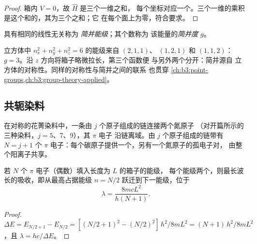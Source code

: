 \begin{proof}
箱内 $V = 0$，故 $\hat H$ 是三个一维之和，
每个坐标对应一个。三个一维的乘积
是这个和的，其为三个之和；它
在每个面上为零，符合要求。
\end{proof}

\begin{definition}[简并能级]\label{def:b3:quantum-model-systems:degenerate}
具有相同的线性无关称为
\emph{简并能级}；其个数称为
该能量的\emph{简并度} $g$。
\end{definition}

\begin{example}[简并与对称性]\label{ex:b3:quantum-model-systems:cube}
立方体中 $n_x^2 + n_y^2 + n_z^2 = 6$ 的能级来自 $(2,1,1)$、
$(1,2,1)$ 和 $(1,1,2)$：$g = 3$。沿 $z$ 方向将箱子略微拉长，第三个函数便
与另外两个分开：简并源自
立方体的对称性。同样的对称性与简并之间的联系
也贯穿 \cref{ch:b3:point-groups,ch:b3:group-theory-applied}。
\end{example}

\subsection*{共轭染料}

在对称的花菁染料中，一条由 $j$ 个原子组成的链连接两个氮原子
（对开篇所示的三种染料，\(j = 5\)、7、9），其 $\pi$ 电子
沿链离域。由 $j$ 个原子组成的链带有 $N = j + 1$ 个 $\pi$
电子：每个碳原子提供一个，另有一个氮原子的孤电子对，
由整个阳离子共享。

\begin{proposition}[自由电子吸收波长]\label{prop:b3:quantum-model-systems:free-electron}
若 $N$ 个 $\pi$ 电子（偶数）填入长度为 $L$ 的箱子的能级，
每个能级两个，则最长波长的吸收，即从最高占据能级
$n = N/2$ 跃迁到下一能级，位于
\[
\lambda = \frac{8mcL^2}{h(N+1)}.
\]
\end{proposition}

\begin{proof}
$\Delta E = E_{N/2+1} - E_{N/2} = [(N/2+1)^2 - (N/2)^2]\,h^2/8mL^2 =
(N+1)\,h^2/8mL^2$，且 $\lambda = hc/\Delta E$。
\end{proof}

